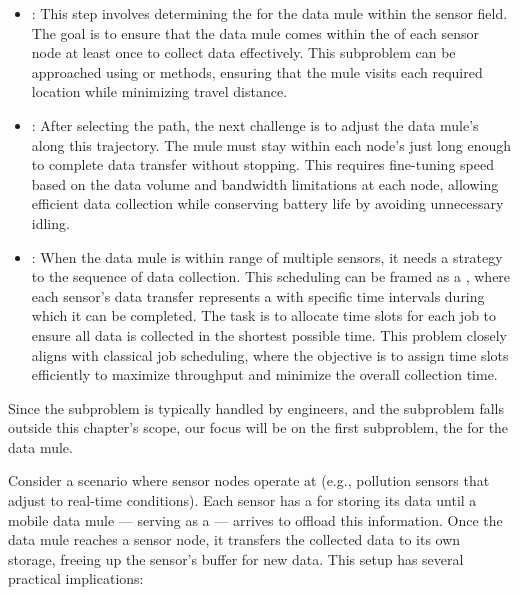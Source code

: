 \documentclass[a4paper, 12pt]{report}
\begin{document}
    \begin{itemize}
        \item {}: This step involves determining the  for the data mule within the sensor field. The goal is to ensure that the data mule comes within the  of each sensor node at least once to collect data effectively. This subproblem can be approached using  or  methods, ensuring that the mule visits each required location while minimizing travel distance.
        \item {}: After selecting the path, the next challenge is to adjust the data mule's  along this trajectory. The mule must stay within each node's  just long enough to complete data transfer without stopping. This requires fine-tuning speed based on the data volume and bandwidth limitations at each node, allowing efficient data collection while conserving battery life by avoiding unnecessary idling.
        \item {}: When the data mule is within range of multiple sensors, it needs a strategy to  the sequence of data collection. This scheduling can be framed as a , where each sensor's data transfer represents a  with specific time intervals during which it can be completed. The task is to allocate time slots for each job to ensure all data is collected in the shortest possible time. This problem closely aligns with classical job scheduling, where the objective is to assign time slots efficiently to maximize throughput and minimize the overall collection time.
    \end{itemize}

    Since the  subproblem is typically handled by engineers, and the  subproblem falls outside this chapter's scope, our focus will be on the first subproblem, the  for the data mule.

    Consider a scenario where sensor nodes operate at  (e.g., pollution sensors that adjust to real-time conditions). Each sensor has a  for storing its data until a mobile data mule --- serving as a  --- arrives to offload this information. Once the data mule reaches a sensor node, it transfers the collected data to its own storage, freeing up the sensor's buffer for new data. This setup has several practical implications:
\end{document}
